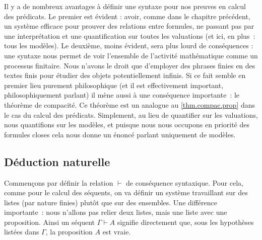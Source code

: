 Il y a de nombreux avantages à définir une syntaxe pour nos preuves en calcul
des prédicats. Le premier est évident : avoir, comme dans le chapitre précédent,
un système efficace pour prouver des relations entre formules, ne passant pas
par une interprétation et une quantification sur toutes les valuations (et ici,
en plus~: tous les modèles). Le deuxième, moins évident, sera plus lourd de
conséquences : une syntaxe nous permet de voir l'ensemble de l'activité
mathématique comme un processus finitaire. Nous n'avons le droit que d'employer
des phrases finies en des textes finis pour étudier des objets potentiellement
infinis. Si ce fait semble en premier lieu purement philosophique (et il est
effectivement important, philosophiquement parlant) il mène aussi à une
conséquence importante~: le théorème de compacité. Ce théorème est un analogue
au \cref{thm.compac.prop} dans le cas du calcul des prédicats. Simplement, au
lieu de quantifier sur les valuations, nous quantifions sur les modèles, et
puisque nous nous occupons en priorité des formules closes cela nous donne un
énoncé parlant uniquement de modèles.

\subsection{Déduction naturelle}

Commençons par définir la relation $\vdash$ de conséquence syntaxique. Pour
cela, comme pour le calcul des séquents, on va définir un système travaillant
sur des listes (par nature finies) plutôt que sur des ensembles. Une différence
importante~: nous n'allons pas relier deux listes, mais une liste avec une
proposition. Ainsi un séquent $\Gamma\vdash A$ signifie directement que, sous
les hypothèses listées dans $\Gamma$, la proposition $A$ est vraie.

